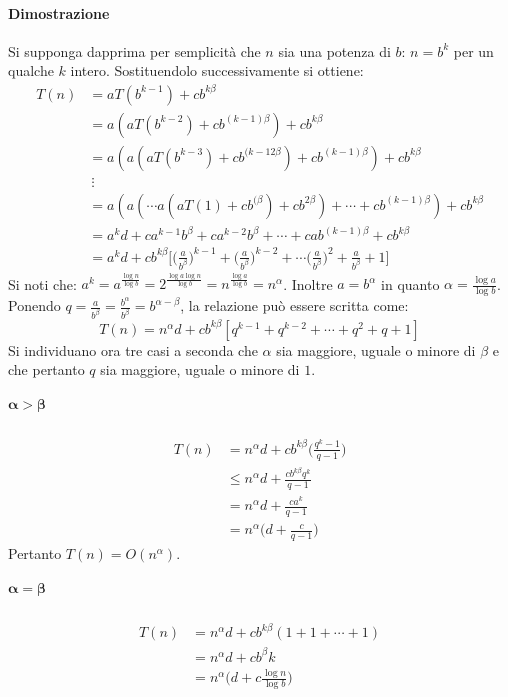 \paragraph{Dimostrazione}\mbox{}
Si supponga dapprima per semplicit\`a che $n$ sia una potenza di $b$: $n = b^k$ per un qualche $k$ intero. Sostituendolo successivamente si ottiene: 
\begin{align*}
	T(n) &= aT(b^{k-1}) + cb^{k\beta} \\
	     &= a(aT(b^{k-2}) + cb^{(k-1)\beta}) + cb^{k\beta}\\
	     &= a(a(aT(b^{k-3}) + cb^{(k-12\beta}) + cb^{(k-1)\beta}) + cb^{k\beta}\\
	     &\ \vdots \\
	     &= a(a(\cdots a(aT(1) + cb^{(\beta}) + cb^{2\beta})+\cdots+cb^{(k-1)\beta})+cb^{k\beta}\\
	     &= a^kd + ca^{k-1}b^\beta + ca^{k-2}b^\beta + \cdots + cab^{(k-1)\beta} + cb^{k\beta}\\
	     &= a^kd + cb^{k\beta}\biggl[\biggl(\frac{a}{b^\beta}\biggr)^{k-1} + \biggl(\frac{a}{b^\beta}\biggr)^{k-2} + \cdots \biggl(\frac{a}{b^\beta}\biggr)^{2} + \frac{a}{b^\beta} + 1
	     	\biggr]
\end{align*}
Si noti che: $a^k = a^{\frac{\log n}{\log b}}= 2^{\frac{\log a \log n}{\log b}} = n^{\frac{\log a}{\log b}} = n^\alpha$. Inoltre $a = b^\alpha$ in quanto $\alpha = \frac{\log a}{\log b}$.
Ponendo $q = \frac{a}{b^\beta} = \frac{b^\alpha}{b^\beta} = b^{\alpha - \beta}$, la relazione pu\`o essere scritta come: 
$$ T(n) = n^\alpha d + cb^{k\beta}[q^{k-1} + q^{k-2} + \cdots + q^2 + q + 1]$$
Si individuano ora tre casi a seconda che $\alpha$ sia maggiore, uguale o minore di $\beta$ e che pertanto $q$ sia maggiore, uguale o minore di $1$. 
\subparagraph{$\mathbf{\alpha > \beta}$}
\begin{align*}
	T(n) &= n^\alpha d + cb^{k\beta}\biggl(\frac{q^k - 1}{q -1}\biggr)\\
	     &\le n^\alpha d + \frac{cb^{k\beta}q^k}{q-1}\\
	     &= n^\alpha d + \frac{ca^k}{q-1}\\
	     &=  n^\alpha\biggl(d + \frac{c}{q-1}\biggr)
\end{align*}
Pertanto $T(n) = O(n^\alpha)$.
\subparagraph{$\mathbf{\alpha = \beta}$}
\begin{align*}
	T(n) &= n^\alpha d + cb^{k\beta}(1+1+\cdots+1)\\
	     &= n^\alpha d +cb^\beta k\\
	     &= n^\alpha\biggl(d+c\frac{\log n}{\log b}\biggr)
\end{align*}
